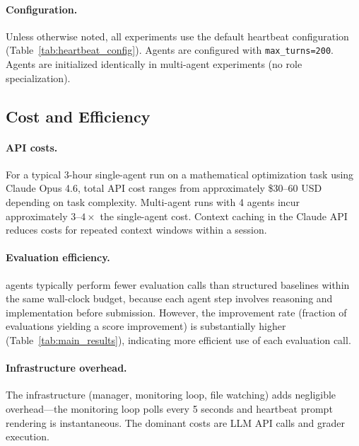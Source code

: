 \paragraph{Configuration.} Unless otherwise noted, all \method{} experiments use the default heartbeat configuration (Table~\ref{tab:heartbeat_config}). Agents are configured with \texttt{max\_turns=200}. Agents are initialized identically in multi-agent experiments (no role specialization).

\subsection{Cost and Efficiency}
\label{app:cost}

\paragraph{API costs.} For a typical 3-hour single-agent run on a mathematical optimization task using Claude Opus 4.6, total API cost ranges from approximately \$30--60 USD depending on task complexity. Multi-agent runs with 4 agents incur approximately $3$--$4\times$ the single-agent cost. Context caching in the Claude API reduces costs for repeated context windows within a session.

\paragraph{Evaluation efficiency.} \method{} agents typically perform fewer evaluation calls than structured baselines within the same wall-clock budget, because each agent step involves reasoning and implementation before submission. However, the improvement rate (fraction of evaluations yielding a score improvement) is substantially higher (Table~\ref{tab:main_results}), indicating more efficient use of each evaluation call.

\paragraph{Infrastructure overhead.} The \method{} infrastructure (manager, monitoring loop, file watching) adds negligible overhead---the monitoring loop polls every 5 seconds and heartbeat prompt rendering is instantaneous. The dominant costs are LLM API calls and grader execution.
